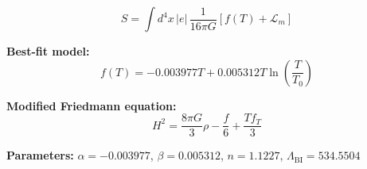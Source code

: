 
\begin{equation}
  S = \int d^4x \, |e| \, \frac{1}{16\pi G} \left[ f(T) + \mathcal{L}_m \right]
\end{equation}

\textbf{Best-fit model:}
\begin{equation}
  f(T) = -0.003977 T + 0.005312 T \ln\!\left(\frac{T}{T_0}\right)
\end{equation}

\textbf{Modified Friedmann equation:}
\begin{equation}
  H^2 = \frac{8\pi G}{3} \rho - \frac{f}{6} + \frac{T f_T}{3}
\end{equation}

\textbf{Parameters:}
$\alpha = -0.003977$, \quad
$\beta = 0.005312$, \quad
$n = 1.1227$, \quad
$\Lambda_{\text{BI}} = 534.5504$
